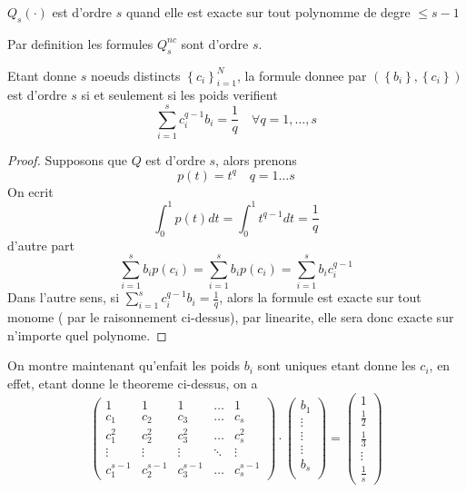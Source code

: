 \documentclass[../main.tex]{subfiles}
\begin{document}
\begin{defn}
	$Q_s( \cdot) $ 	est d'ordre $s$ quand elle est exacte sur tout polynomme de degre $ \leq s-1$
\end{defn}
\begin{rmq}
Par definition les formules $Q_s^{nc}$ sont d'ordre $s$.
\end{rmq}
\begin{thm}
	Etant donne $s$ noeuds distincts $ \left\{ c_i \right\}_{i=1}^{N}$, la formule donnee par $ \left( \left\{ b_i \right\}, \left\{ c_i \right\} \right) $ est d'ordre $s$ si et seulement si les poids verifient
	\[ 
	\sum_{i=1}^{ s} c_i^{q-1} b_i = \frac{1}{q} \quad \forall q = 1, \ldots, s
	\]
\end{thm}
\begin{proof}
Supposons que $Q$ est d'ordre $s$, alors prenons
\[ 
p( t) = t^{q} \quad q= 1\ldots s 
\]
On ecrit
\[ 
\int_{ 0 }^{ 1 }p( t) dt = \int_{ 0 }^{ 1 }t^{q-1}dt = \frac{1}{q}
\]
d'autre part
\[ 
\sum_{i=1}^{ s}b_i p( c_i)  = \sum_{i=1}^{ s}b_i p( c_i) = \sum_{i=1}^{ s}b_i c_i^{q-1}
\]
Dans l'autre sens, si $ \sum_{i=1}^{ s}c_i^{q-1}b_i = \frac{1}{q}$, alors la formule est exacte sur tout monome ( par le raisonnement ci-dessus), par linearite, elle sera donc exacte sur n'importe quel polynome.
\end{proof}
On montre maintenant qu'enfait les poids $ b_i$ sont uniques etant donne les $ c_i$, en effet, etant donne le theoreme ci-dessus, on a
\[ 
\begin{pmatrix}
	1 & 1 &1 &\ldots & 1\\
	c_1 & c_2 & c_3 & \ldots & c_s\\
	c_1^{2} & c_2^{2} & c_3^{2} & \ldots & c_s^{2}\\
	\vdots & \vdots & \vdots & \ddots & \vdots\\
	c_1^{s-1 }& c_2^{s-1}& c_3^{s-1}&\ldots & c_s^{s-1}
\end{pmatrix} 
\cdot
\begin{pmatrix}
b_1\\
\vdots \\
\vdots\\
\vdots\\
b_s\\
\end{pmatrix} 
=
\begin{pmatrix}
1\\
\frac{1}{2}\\
\frac{1}{3}\\
\vdots\\
\frac{1}{s}
\end{pmatrix} 
\]
\end{document}
